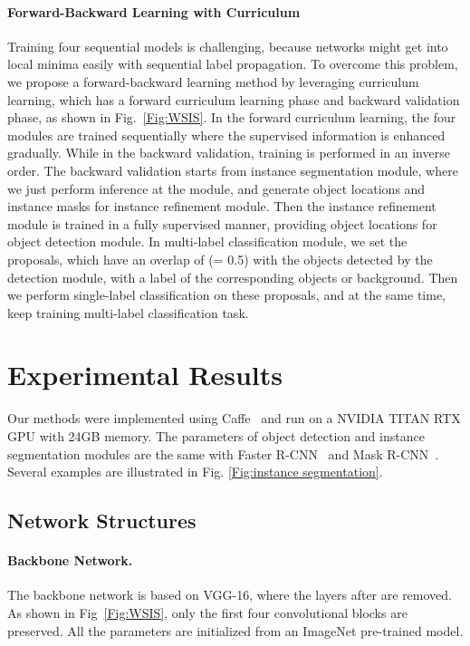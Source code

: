 \documentclass[10pt,twocolumn,letterpaper]{article}
\begin{document}
\paragraph{Forward-Backward Learning with Curriculum} Training four sequential models is challenging, because networks might get into local minima easily with sequential label propagation. To overcome this problem, we propose a forward-backward learning method by leveraging curriculum learning, which has a forward curriculum learning phase and backward validation phase, as shown in Fig.~\ref{Fig:WSIS}.
In the forward curriculum learning, the four modules are trained sequentially where the supervised information is enhanced gradually.  While in the backward validation, training is performed in an inverse order. The backward validation starts from instance segmentation module, where we just perform inference at the module, and generate object locations and instance masks for instance refinement module. Then the instance refinement module is trained in a fully supervised manner, providing object locations for object detection module.
In multi-label classification module, we set the proposals, which have an overlap of  (= 0.5) with the objects detected by the detection module, with a label of the corresponding objects or background. Then we perform single-label classification on these proposals, and at the same time, keep training multi-label classification task.


\section{Experimental Results}
Our methods were implemented using Caffe~\cite{jia2014caffe} and run on a NVIDIA TITAN RTX GPU with 24GB memory. The parameters of object detection and instance segmentation modules are the same with Faster R-CNN~\cite{renNIPS15fasterrcnn} and Mask R-CNN~\cite{he2017mask}. Several examples are illustrated in Fig. \ref{Fig:instance segmentation}.

\subsection{Network Structures}
\paragraph{Backbone Network.} The backbone network is based on VGG-16, where the layers after  are removed. As shown in Fig~\ref{Fig:WSIS}, only the first four convolutional blocks are preserved. All the parameters are initialized from an ImageNet pre-trained model.
\vspace{-4mm}
\end{document}
